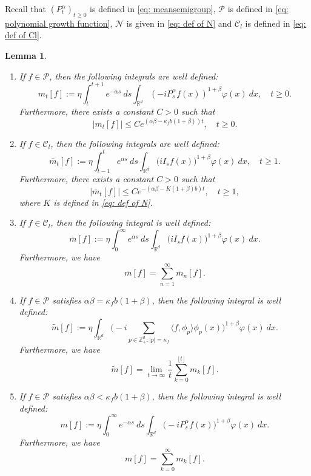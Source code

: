\documentclass[12pt,a4paper]{amsart}
\theoremstyle{plain}
\newtheorem{lem}[thm]{Lemma}
\theoremstyle{definition}
\numberwithin{equation}{section}
\begin{document}
   Recall that
    $(P^\alpha_t)_{t\geq 0}$ is defined in \eqref{eq: meansemigroup}, $\mathcal P$ is defined in \eqref{eq: polynomial growth function}, $\mathcal N$ is given in \eqref{eq: def of N} and $\mathcal C_l$ is defined in \eqref{eq: def of Cl}.
\begin{lem}
\label{lem: def of all m}
\begin{enumerate}
\item
If $f\in\mathcal{P}$, then the following integrals are well defined:
\[
	m_t[f]
        := \eta \int_t^{t+1}e^{-\alpha s}~ds\int_{\mathbb R^d} (-iP_{s}^\alpha f(x))^{1+\beta} \varphi(x)~dx,
    \quad t\geq 0.
\]
	Furthermore, there exists a constant $C>0$ such that
\begin{equation}\label{domi-m}
    |m_t[f]|
    \leq C e^{(\alpha\beta-\kappa_fb(1+\beta))t},
    \quad t\geq 0.
\end{equation}
\item
If $f\in\mathcal C_l$, then the following integrals are well defined:
\[
    \bar{m}_t[f]
    := \eta \int_{t-1}^{t} e^{\alpha s}~ds \int_{\mathbb R^d}\big(iI_sf(x)\big)^{1+\beta} \varphi(x)~dx, \quad t\geq 1.
\]
    Furthermore, there exists a constant $C>0$ such that
\begin{equation}
    |\bar{m}_t[f]| \leq C e^{-(\alpha\beta-K(1+\beta)b)t}, \quad t\geq 1,
\end{equation}
where $K$ is defined in \eqref{eq: def of N}.
\item
If $f \in \mathcal C_l$, then the following integral is well defined:
\[
    \bar{m}[f]
   :=\eta \int_{0}^{\infty} e^{\alpha s}~ds \int_{\mathbb R^d} \big(iI_sf(x)\big)^{1+\beta}\varphi(x)~dx.
\]
    Furthermore, we have
\begin{equation}\label{sum-bar-m}
    \bar{m}[f]
    =\sum_{n=1}^{\infty}\bar{m}_n[f].
\end{equation}
\item
If $f \in \mathcal{P}$ satisfies  $\alpha\beta=\kappa_f b(1+\beta)$, then the following integral is well defined:
\[
	\widetilde{m}[f]
    := \eta\int_{\mathbb R^d} \Big(-i\sum_{p\in \mathbb Z_+^d:|p|=\kappa_f}\langle f,\phi_p\rangle\phi_p(x)\Big)^{1+\beta} \varphi(x)~dx.
\]
	Furthermore, we have
\begin{equation}
\label{para: critical case}
	\widetilde{m}[f] = \lim_{t\rightarrow \infty}\frac{1}{t}\sum_{k=0}^{\lfloor t \rfloor}m_k[f].
\end{equation}
\item
If $f\in \mathcal{P}$ satisfies $\alpha\beta<\kappa_fb(1+\beta)$, then the following integral is well defined:
\[
    m[f]
    :=\eta \int_0^{\infty} e^{-\alpha s} ~ds\int_{\mathbb R^d} \big(-iP_s^\alpha f(x)\big)^{1+\beta} \varphi(x)~dx.
\]
	Furthermore, we have
\begin{equation}\label{sum-m}
	m[f]
    =\sum_{k=0}^\infty m_k[f].
\end{equation}
\end{enumerate}
\end{lem}
\end{document}
